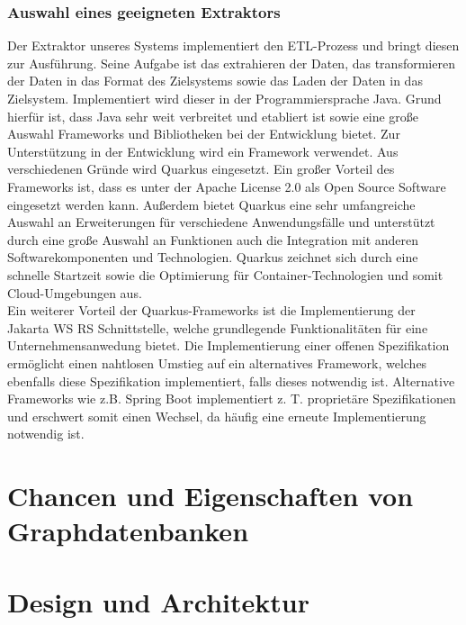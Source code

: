 \documentclass[10pt]{article}
\begin{document}
\subsubsection{Auswahl eines geeigneten Extraktors}
Der Extraktor unseres Systems implementiert den ETL-Prozess und bringt diesen zur Ausführung. Seine Aufgabe ist das extrahieren der Daten, das transformieren der Daten in das Format des Zielsystems sowie das Laden der Daten in das Zielsystem. Implementiert wird dieser in der Programmiersprache Java. Grund hierfür ist, dass Java sehr weit verbreitet und etabliert ist sowie eine große Auswahl Frameworks und Bibliotheken bei der Entwicklung bietet. Zur Unterstützung in der Entwicklung wird ein Framework verwendet. Aus verschiedenen Gründe wird Quarkus eingesetzt. Ein großer Vorteil des Frameworks ist, dass es unter der Apache License 2.0 als Open Source Software eingesetzt werden kann. Außerdem bietet Quarkus eine sehr umfangreiche Auswahl an Erweiterungen für verschiedene Anwendungsfälle und unterstützt durch eine große Auswahl an Funktionen auch die Integration mit anderen Softwarekomponenten und Technologien. Quarkus zeichnet sich durch eine schnelle Startzeit sowie die Optimierung für Container-Technologien und somit Cloud-Umgebungen aus.\\
Ein weiterer Vorteil der Quarkus-Frameworks ist die Implementierung der Jakarta WS RS Schnittstelle, welche grundlegende Funktionalitäten für eine Unternehmensanwedung bietet. Die Implementierung einer offenen Spezifikation ermöglicht einen nahtlosen Umstieg auf ein alternatives Framework, welches ebenfalls diese Spezifikation implementiert, falls dieses notwendig ist. Alternative Frameworks wie z.B. Spring Boot implementiert z. T. proprietäre Spezifikationen und erschwert somit einen Wechsel, da häufig eine erneute Implementierung notwendig ist.
\section{Chancen und Eigenschaften von Graphdatenbanken}
\section{Design und Architektur}
\end{document}
